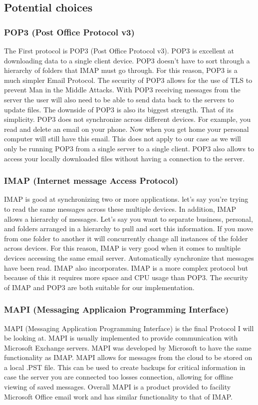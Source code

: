 \subsection{ Potential choices }
\subsubsection{ POP3 (Post Office Protocol v3) }
The First protocol is POP3 (Post Office Protocol v3). POP3 is excellent at downloading data to a single client device. POP3 doesn’t have to sort through a hierarchy of folders that IMAP must go through. For this reason, POP3 is a much simpler Email Protocol. The security of POP3 allows for the use of TLS to prevent Man in the Middle Attacks. With POP3 receiving messages from the server the user will also need to be able to send data back to the servers to update files. The downside of POP3 is also its biggest strength. That of its simplicity. POP3 does not synchronize across different devices. For example, you read and delete an email on your phone. Now when you get home your personal computer will still have this email. This does not apply to our case as we will only be running POP3 from a single server to a single client. POP3 also allows to access your locally downloaded files without having a connection to the server.
\subsubsection{ IMAP (Internet message Access Protocol) }
IMAP is good at synchronizing two or more applications. let’s say you’re trying to read the same messages across these multiple devices. In addition, IMAP allows a hierarchy of messages. Let’s say you want to separate business, personal, and folders arranged in a hierarchy to pull and sort this information.  If you move from one folder to another it will concurrently change all instances of the folder across devices. For this reason, IMAP is very good when it comes to multiple devices accessing the same email server. Automatically synchronize that messages have been read. IMAP also incorporates. IMAP is a more complex protocol but because of this it requires more space and CPU usage than POP3. The security of IMAP and POP3 are both suitable for our implementation.
\subsubsection{ MAPI (Messaging Applicaion Programming Interface) }
MAPI (Messaging Application Programming Interface) is the final Protocol I will be looking at. MAPI is usually implemented to provide communication with Microsoft Exchange servers. MAPI was developed by Microsoft to have the same functionality as IMAP. MAPI allows for messages from the cloud to be stored on a local .PST file. This can be used to create backups for critical information in case the server you are connected too losses connection, allowing for offline viewing of saved messages. Overall MAPI is a product provided to facility Microsoft Office email work and has similar functionality to that of IMAP.
